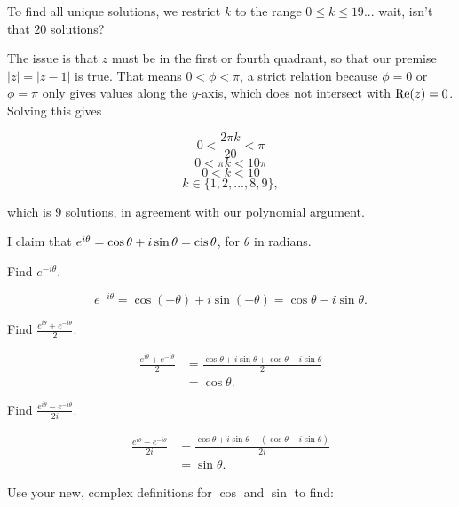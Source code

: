 \documentclass[../key.tex]{subfiles}
\begin{document}
To find all unique solutions, we restrict $k$ to the range $0\leq k\leq 19$... wait, isn't that $20$ solutions?

The issue is that $z$ must be in the first or fourth quadrant, so that our premise $|z|=|z-1|$ is true. That means $0 < \phi < \pi$, a strict relation because $\phi = 0$ or $\phi=\pi$ only gives values along the $y$-axis, which does not intersect with $\operatorname{Re}(z) = 0$. Solving this gives

$$0 < \frac{2\pi k}{20} < \pi$$
$$0 < \pi k < 10\pi$$
$$0 < k < 10$$
$$k\in \{1,2, ..., 8,9\},$$

which is $9$ solutions, in agreement with our polynomial argument.

\begin{outer_problem}
\item I claim that $e^{i\theta}=\cos\theta + i\sin\theta = \operatorname{cis}\theta$, for $\theta$ in radians.
\setcounter{store_outer_problem}{\value{outer_problemi}}
\end{outer_problem}

\begin{inner_problem}[start=1]
\item Find $e^{-i\theta}$.
\end{inner_problem}

$$e^{-i\theta} = \cos (-\theta) + i\sin(-\theta) = \cos \theta - i\sin \theta.$$

\begin{inner_problem}
\item Find $\frac{e^{i\theta} + e^{-i\theta}}{2}$.
\end{inner_problem}

\begin{align*}
\frac{e^{i\theta} + e^{-i\theta}}{2} &= \frac{\cos \theta + i\sin\theta + \cos\theta - i\sin\theta}{2} \\
&= \cos\theta.
\end{align*}

\begin{inner_problem}
\item Find $\frac{e^{i\theta} - e^{-i\theta}}{2i}$.
\end{inner_problem}

\begin{align*}
\frac{e^{i\theta} - e^{-i\theta}}{2i} &= \frac{\cos \theta + i\sin\theta - (\cos\theta - i\sin\theta)}{2i} \\
&= \sin\theta.
\end{align*}

\begin{outer_problem}
\item Use your new, complex definitions for $\cos$ and $\sin$ to find:%
\end{outer_problem}
\end{document}
